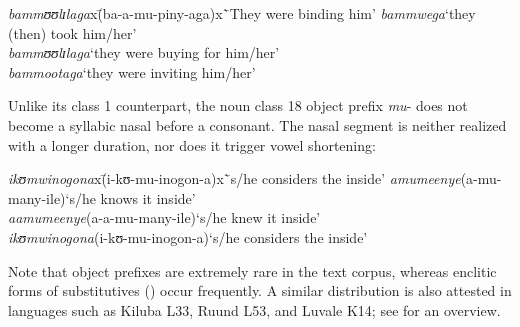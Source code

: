\begin{exe}
	\ex \label{exOMNCL1Vowel}
	\begin{tabbing}
		\textit{bammʊʊlɪlaga}x\=(\degree ba-a-mu-piny-aga)x\=`They were binding him'\kill
		\textit{bammwega}\> [β̝a.ˈmːʷɛˑ.ɰa]\>`they (then) took him/her'\\
		\textit{bammʊʊlɪlaga}\>`they were buying for him/her'\\ 
	    \textit{bammootaga}\>`they were inviting him/her'
	\end{tabbing}
\end{exe}

Unlike its class 1 counterpart, the noun class 18 object prefix \textit{mu}- does not become a syllabic nasal before a consonant. The nasal segment is neither realized with a longer duration, nor does it trigger vowel shortening:
\begin{exe}
	\ex
	\begin{tabbing}
		\textit{ikʊmwinogona}x\=(\degree i-kʊ-mu-inogon-a)x\=`s/he considers the inside'\kill
		\textit{amumeenye}\>(\degree a-mu-many-ile)\>`s/he knows it inside'
		\\\textit{aamumeenye}\>(\degree a-a-mu-many-ile)\>`s/he knew it inside'
		\\\textit{ikʊmwinogona}\>(\degree i-kʊ-mu-inogon-a)\>`s/he considers the inside'
	\end{tabbing}
\end{exe}

Note that  object prefixes are extremely rare in the text corpus, whereas enclitic forms of  substitutives () occur frequently. A similar distribution is also attested in languages such as Kiluba L33, Ruund L53, and Luvale K14; see \citet{DevosMPersohnB2017} for an overview. 
